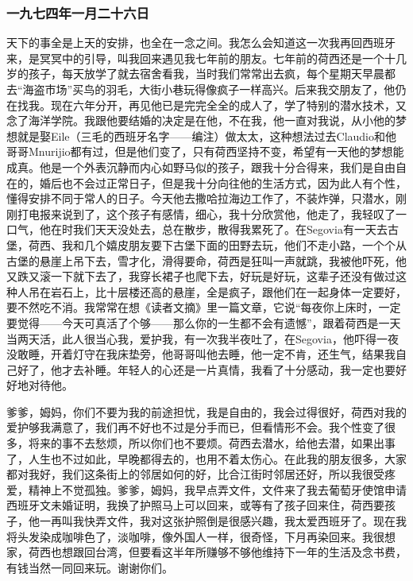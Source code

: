 \subsubsection{一九七四年一月二十六日}

\par {}
\par 天下的事全是上天的安排，也全在一念之间。我怎么会知道这一次我再回西班牙来，是冥冥中的引导，叫我回来遇见我七年前的朋友。七年前的荷西还是一个十几岁的孩子，每天放学了就去宿舍看我，当时我们常常出去疯，每个星期天早晨都去“海盗市场”买鸟的羽毛，大街小巷玩得像疯子一样高兴。后来我交朋友了，他仍在找我。现在六年分开，再见他已是完完全全的成人了，学了特别的潜水技术，又念了海洋学院。我跟他要结婚的决定是在他，不在我，他一直对我说，从小他的梦想就是娶Eile（三毛的西班牙名字——编注）做太太，这种想法过去Claudio和他哥哥Mnurijio都有过，但是他们变了，只有荷西坚持不变，希望有一天他的梦想能成真。他是一个外表沉静而内心如野马似的孩子，跟我十分合得来，我们是自由自在的，婚后也不会过正常日子，但是我十分向往他的生活方式，因为此人有个性，懂得安排不同于常人的日子。今天他去撒哈拉海边工作了，不装炸弹，只潜水，刚刚打电报来说到了，这个孩子有感情，细心，我十分欣赏他，他走了，我轻叹了一口气，他在时我们天天没处去，总在散步，散得我累死了。在Segovia有一天去古堡，荷西、我和几个嬉皮朋友要下古堡下面的田野去玩，他们不走小路，一个个从古堡的悬崖上吊下去，雪才化，滑得要命，荷西是狂叫一声就跳，我被他吓死，他又跌又滚一下就下去了，我穿长裙子也爬下去，好玩是好玩，这辈子还没有做过这种人吊在岩石上，比十层楼还高的悬崖，全是疯子，跟他们在一起身体一定要好，要不然吃不消。我常常在想《读者文摘》里一篇文章，它说“每夜你上床时，一定要觉得——今天可真活了个够——那么你的一生都不会有遗憾”，跟着荷西是一天当两天活，此人很当心我，爱护我，有一次我半夜吐了，在Segovia，他吓得一夜没敢睡，开着灯守在我床垫旁，他哥哥叫他去睡，他一定不肯，还生气，结果我自己好了，他才去补睡。年轻人的心还是一片真情，我看了十分感动，我一定也要好好地对待他。
\par 爹爹，姆妈，你们不要为我的前途担忧，我是自由的，我会过得很好，荷西对我的爱护够我满意了，我们再不好也不过是分手而已，但看情形不会。我个性变了很多，将来的事不去愁烦，所以你们也不要烦。荷西去潜水，给他去潜，如果出事了，人生也不过如此，早晚都得去的，也用不着太伤心。在此我的朋友很多，大家都对我好，我们这条街上的邻居如何的好，比合江街时邻居还好，所以我很受疼爱，精神上不觉孤独。爹爹，姆妈，我早点弄文件，文件来了我去葡萄牙使馆申请西班牙文未婚证明，我换了护照马上可以回来，或等有了孩子回来住，荷西要孩子，他一再叫我快弄文件，我对这张护照倒是很感兴趣，我太爱西班牙了。现在我将头发染成咖啡色了，淡咖啡，像外国人一样，很奇怪，下月再染回来。我很想家，荷西也想跟回台湾，但要看这半年所赚够不够他维持下一年的生活及念书费，有钱当然一同回来玩。谢谢你们。
\par {}

